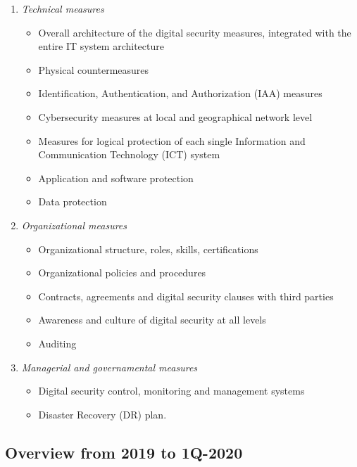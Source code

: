 \documentclass{easychair}
\begin{document}
\begin{enumerate}
\small
	\item \emph{Technical measures}
	\begin{itemize}
		\item Overall architecture of the digital security measures, integrated with the entire IT system architecture
		\item Physical countermeasures
		\item Identification, Authentication, and Authorization (IAA) measures
		\item Cybersecurity measures at local and geographical network level
		\item Measures for logical protection of each single Information and Communication Technology (ICT) system
		\item Application and software protection
		\item Data protection
	\end{itemize}
	\item \emph{Organizational measures}
	\begin{itemize}
		\item Organizational structure, roles, skills, certifications
		\item Organizational policies and procedures
		\item Contracts, agreements and digital security clauses with third parties
		\item Awareness and culture of digital security at all levels
		\item Auditing
	\end{itemize}
	\item \emph{Managerial and governamental measures}
	\begin{itemize}
		\item Digital security control, monitoring and management systems
		\item Disaster Recovery (DR) plan.
	\end{itemize}
\end{enumerate}

\subsection{Overview from 2019 to 1Q-2020}
\end{document}
